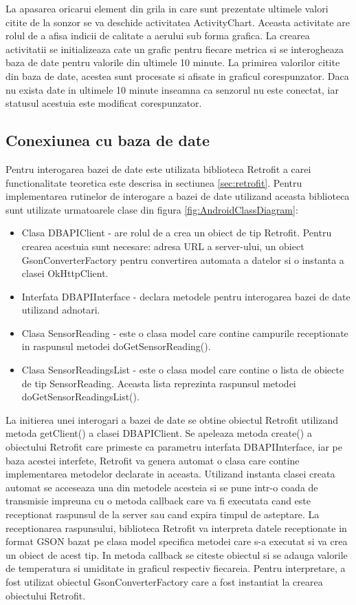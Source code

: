 La apasarea oricarui element din grila in care sunt prezentate ultimele valori citite de la sonzor se va deschide activitatea ActivityChart. Aceasta activitate are rolul 
de a afisa indicii de calitate a aerului sub forma grafica. La crearea activitatii se initializeaza cate un grafic pentru fiecare metrica si se interogheaza baza de date 
pentru valorile din ultimele 10 minute. La primirea valorilor citite din baza de date, acestea sunt procesate si afisate in graficul corespunzator. Daca nu exista date 
in ultimele 10 minute inseamna ca senzorul nu este conectat, iar statusul acestuia este modificat corespunzator.

\subsection{Conexiunea cu baza de date}\label{subsec:pi_appandroid_conexiunea_cu_db}
Pentru interogarea bazei de date este utilizata biblioteca Retrofit a carei functionalitate teoretica este descrisa in sectiunea \ref{sec:retrofit}. Pentru implementarea 
rutinelor de interogare a bazei de date utilizand aceasta biblioteca sunt utilizate urmatoarele clase din figura \ref{fig:AndroidClassDiagram}:
\begin{itemize}
	\item Clasa DBAPIClient - are rolul de a crea un obiect de tip Retrofit. Pentru crearea acestuia sunt necesare: adresa URL a server-ului, un obiect GsonConverterFactory 
	pentru convertirea automata a datelor si o instanta a clasei OkHttpClient.
	\item Interfata DBAPIInterface - declara metodele pentru interogarea bazei de date utilizand adnotari.
	\item Clasa SensorReading - este o clasa model care contine campurile receptionate in raspunsul metodei doGetSensorReading().
	\item Clasa SensorReadingsList - este o clasa model care contine o lista de obiecte de tip SensorReading. Aceasta lista reprezinta raspunsul metodei doGetSensorReadingsList().
\end{itemize}

La initierea unei interogari a bazei de date se obtine obiectul Retrofit utilizand metoda getClient() a clasei DBAPIClient. Se apeleaza metoda create() a obiectului Retrofit care 
primeste ca parametru interfata DBAPIInterface, iar pe baza acestei interfete, Retrofit va genera automat o clasa care contine implementarea metodelor declarate in aceasta. 
Utilizand instanta clasei creata automat se acceseaza una din metodele acesteia si se pune intr-o coada de transmisie impreuna cu o metoda callback care va fi executata cand 
este receptionat raspunsul de la server sau cand expira timpul de asteptare. La receptionarea raspunsului, biblioteca Retrofit va interpreta datele receptionate in format GSON 
bazat pe clasa model specifica metodei care s-a executat si va crea un obiect de acest tip. In metoda callback se citeste obiectul si se adauga valorile de temperatura si 
umiditate in graficul respectiv fiecareia. Pentru interpretare, a fost utilizat obiectul GsonConverterFactory care a fost instantiat la crearea obiectului Retrofit.

